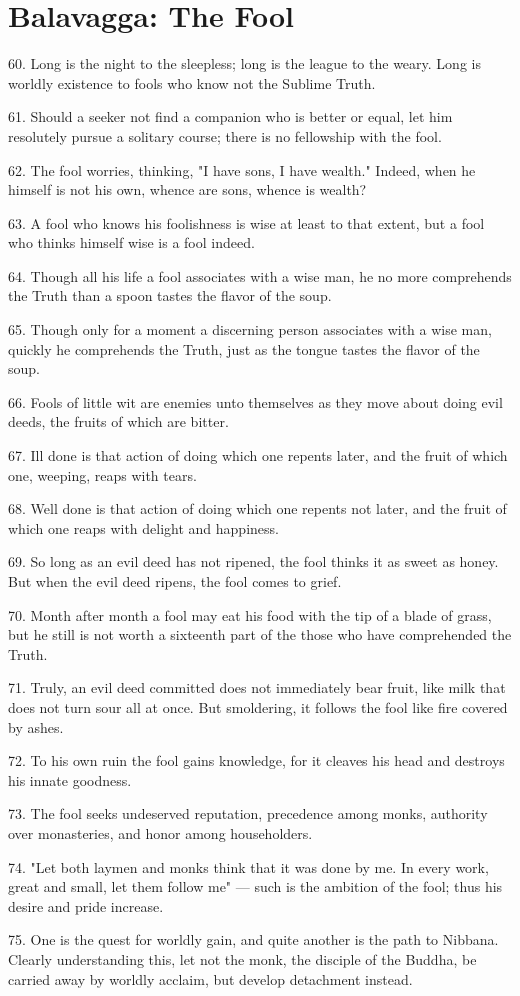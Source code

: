 \newpage
\chapter{Balavagga: The Fool}

60. Long is the night to the sleepless; long is the league to the weary. Long is worldly existence to fools who know not the Sublime Truth.

61. Should a seeker not find a companion who is better or equal, let him resolutely pursue a solitary course; there is no fellowship with the fool.

62. The fool worries, thinking, "I have sons, I have wealth." Indeed, when he himself is not his own, whence are sons, whence is wealth?

63. A fool who knows his foolishness is wise at least to that extent, but a fool who thinks himself wise is a fool indeed.

64. Though all his life a fool associates with a wise man, he no more comprehends the Truth than a spoon tastes the flavor of the soup.

65. Though only for a moment a discerning person associates with a wise man, quickly he comprehends the Truth, just as the tongue tastes the flavor of the soup.

66. Fools of little wit are enemies unto themselves as they move about doing evil deeds, the fruits of which are bitter.

67. Ill done is that action of doing which one repents later, and the fruit of which one, weeping, reaps with tears.

68. Well done is that action of doing which one repents not later, and the fruit of which one reaps with delight and happiness.

69. So long as an evil deed has not ripened, the fool thinks it as sweet as honey. But when the evil deed ripens, the fool comes to grief.

70. Month after month a fool may eat his food with the tip of a blade of grass, but he still is not worth a sixteenth part of the those who have comprehended the Truth.

71. Truly, an evil deed committed does not immediately bear fruit, like milk that does not turn sour all at once. But smoldering, it follows the fool like fire covered by ashes.

72. To his own ruin the fool gains knowledge, for it cleaves his head and destroys his innate goodness.

73. The fool seeks undeserved reputation, precedence among monks, authority over monasteries, and honor among householders.

74. "Let both laymen and monks think that it was done by me. In every work, great and small, let them follow me" — such is the ambition of the fool; thus his desire and pride increase.

75. One is the quest for worldly gain, and quite another is the path to Nibbana. Clearly understanding this, let not the monk, the disciple of the Buddha, be carried away by worldly acclaim, but develop detachment instead.
